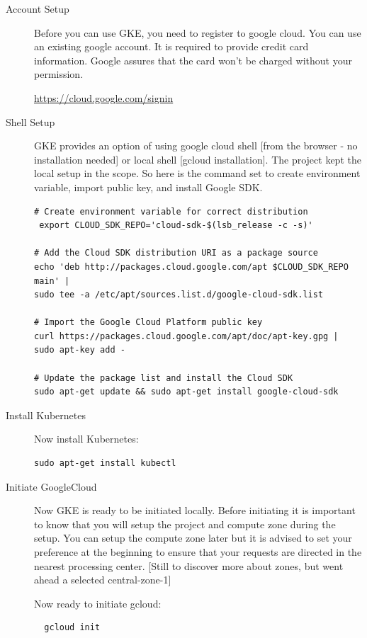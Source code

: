 \begin{description}

\item[Account Setup] Before you can use GKE, you need to register to
  google cloud. You can use an existing google account. It is required
  to provide credit card information.  Google assures that the card
  won't be charged without your permission.

\url{https://cloud.google.com/signin}

\item[Shell Setup] GKE provides an option of using google cloud shell
  [from the browser - no installation needed] or local shell [gcloud
  installation]. The project kept the local setup in the scope. So
  here is the command set to create environment variable, import
  public key, and install Google SDK.

\begin{verbatim}
# Create environment variable for correct distribution
 export CLOUD_SDK_REPO='cloud-sdk-$(lsb_release -c -s)'

# Add the Cloud SDK distribution URI as a package source
echo 'deb http://packages.cloud.google.com/apt $CLOUD_SDK_REPO main' | 
sudo tee -a /etc/apt/sources.list.d/google-cloud-sdk.list

# Import the Google Cloud Platform public key
curl https://packages.cloud.google.com/apt/doc/apt-key.gpg | sudo apt-key add -

# Update the package list and install the Cloud SDK
sudo apt-get update && sudo apt-get install google-cloud-sdk
\end{verbatim}

\item[Install Kubernetes] Now install Kubernetes:

\begin{verbatim}
sudo apt-get install kubectl
\end{verbatim}

\item[Initiate GoogleCloud] Now GKE is ready to be initiated locally. Before 
initiating it is 
important to know that you will setup the project and compute zone during the 
setup. You can setup the compute zone later but it is advised to set your 
preference at the beginning to ensure that your requests are directed in the 
nearest processing center. [Still to discover more about zones, but went ahead 
a selected central-zone-1] 

Now ready to initiate gcloud:
\begin{verbatim}
  gcloud init
\end{verbatim}


\end{description}

